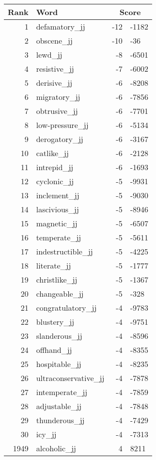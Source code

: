 \begin{longtable}[!htbp]{| rlr@{.}l |}
    \hline
    \textbf{Rank} & \textbf{Word} & \multicolumn{2}{c|}{\textbf{Score}} \\
    \hline
    \endhead
    1 & defamatory\_jj & -12 & -1182 \\
    2 & obscene\_jj & -10 & -36 \\
    3 & lewd\_jj & -8 & -6501 \\
    4 & resistive\_jj & -7 & -6002 \\
    5 & derisive\_jj & -6 & -8208 \\
    6 & migratory\_jj & -6 & -7856 \\
    7 & obtrusive\_jj & -6 & -7701 \\
    8 & low-pressure\_jj & -6 & -5134 \\
    9 & derogatory\_jj & -6 & -3167 \\
    10 & catlike\_jj & -6 & -2128 \\
    11 & intrepid\_jj & -6 & -1693 \\
    12 & cyclonic\_jj & -5 & -9931 \\
    13 & inclement\_jj & -5 & -9030 \\
    14 & lascivious\_jj & -5 & -8946 \\
    15 & magnetic\_jj & -5 & -6507 \\
    16 & temperate\_jj & -5 & -5611 \\
    17 & indestructible\_jj & -5 & -4225 \\
    18 & literate\_jj & -5 & -1777 \\
    19 & christlike\_jj & -5 & -1367 \\
    20 & changeable\_jj & -5 & -328 \\
    21 & congratulatory\_jj & -4 & -9783 \\
    22 & blustery\_jj & -4 & -9751 \\
    23 & slanderous\_jj & -4 & -8596 \\
    24 & offhand\_jj & -4 & -8355 \\
    25 & hospitable\_jj & -4 & -8235 \\
    26 & ultraconservative\_jj & -4 & -7878 \\
    27 & intemperate\_jj & -4 & -7859 \\
    28 & adjustable\_jj & -4 & -7848 \\
    29 & thunderous\_jj & -4 & -7429 \\
    30 & icy\_jj & -4 & -7313 \\
    1949 & alcoholic\_jj & 4 & 8211 \\

\end{longtable}
